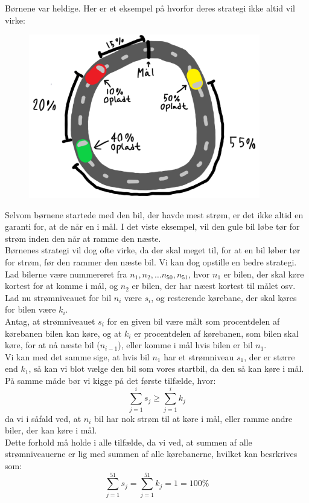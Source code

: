 \documentclass[a4paper,12pt]{article}
\begin{document}
Børnene var heldige. Her er et eksempel på hvorfor deres strategi ikke altid vil virke:
\begin{figure}[H]
    \centering
    \includegraphics[width=0.9\textwidth]{figur2.png}
    \caption{}
\end{figure}

Selvom børnene startede med den bil, der havde mest strøm, er det ikke altid en garanti for, at de når en i mål. I det viste eksempel, vil den gule bil løbe tør for strøm inden den når at ramme den næste.\\
Børnenes strategi vil dog ofte virke, da der skal meget til, for at en bil løber tør for strøm, før den rammer den næste bil. Vi kan dog opstille en bedre strategi.\\
Lad bilerne være nummereret fra $n_1, n_2, \dots n_{50}, n_{51}$, hvor $n_1$ er bilen, der skal køre kortest for at komme i mål, og $n_2$ er bilen, der har næest kortest til målet osv.\\
Lad nu strømniveauet for bil $n_i$ være $s_i$, og resterende kørebane, der skal køres for bilen være $k_i$.\\
Antag, at strømniveauet $s_i$ for en given bil være målt som procentdelen af kørebanen bilen kan køre, og at $k_i$ er procentdelen af kørebanen, som bilen skal køre, for at nå næste bil ($n_{i-1}$), eller komme i mål hvis bilen er bil $n_1$.\\
Vi kan med det samme sige, at hvis bil $n_1$ har et strømniveau $s_1$, der er større end $k_1$, så kan vi blot vælge den bil som vores startbil, da den så kan køre i mål.\\
På samme måde bør vi kigge på det første tilfælde, hvor:
\[\sum_{j=1}^{i}s_j \geq \sum_{j=1}^{i}k_j\]
da vi i såfald ved, at $n_i$ bil har nok strøm til at køre i mål, eller ramme andre biler, der kan køre i mål.\\
Dette forhold må holde i alle tilfælde, da vi ved, at summen af alle strømniveauerne er lig med summen af alle kørebanerne, hvilket kan besrkrives som:
\[\sum_{j=1}^{51}s_j = \sum_{j=1}^{51}k_j = 1 = 100\%\]
\end{document}
